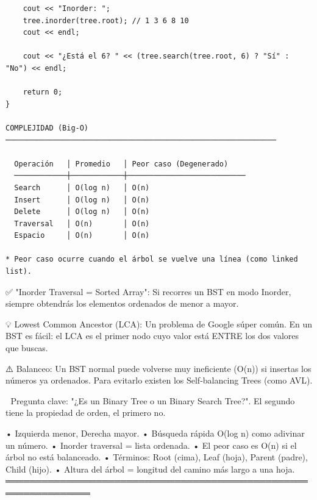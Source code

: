 \begin{lstlisting}
    cout << "Inorder: ";
    tree.inorder(tree.root); // 1 3 6 8 10 
    cout << endl;

    cout << "¿Está el 6? " << (tree.search(tree.root, 6) ? "Sí" : "No") << endl;

    return 0;
}

COMPLEJIDAD (Big-O)
──────────────────────────────────────────────────────────────

  Operación   │ Promedio   │ Peor caso (Degenerado)
  ────────────┼────────────┼───────────────────────────
  Search      │ O(log n)   │ O(n)
  Insert      │ O(log n)   │ O(n)
  Delete      │ O(log n)   │ O(n)
  Traversal   │ O(n)       │ O(n)
  Espacio     │ O(n)       │ O(n)

* Peor caso ocurre cuando el árbol se vuelve una línea (como linked list).
\end{lstlisting}

\begin{dsaentrevistas}

✅ "Inorder Traversal = Sorted Array": Si recorres un BST en modo 
   Inorder, siempre obtendrás los elementos ordenados de menor a mayor.

💡 Lowest Common Ancestor (LCA): Un problema de Google súper común. 
   En un BST es fácil: el LCA es el primer nodo cuyo valor está ENTRE
   los dos valores que buscas.

⚠️ Balanceo: Un BST normal puede volverse muy ineficiente (O(n)) si 
   insertas los números ya ordenados. Para evitarlo existen los 
   Self-balancing Trees (como AVL).

🔑 Pregunta clave: "¿Es un Binary Tree o un Binary Search Tree?". 
   El segundo tiene la propiedad de orden, el primero no.

\end{dsaentrevistas}

\begin{dsaresumen}

• Izquierda menor, Derecha mayor.
• Búsqueda rápida O(log n) como adivinar un número.
• Inorder traversal = lista ordenada.
• El peor caso es O(n) si el árbol no está balanceado.
• Términos: Root (cima), Leaf (hoja), Parent (padre), Child (hijo).
• Altura del árbol = longitud del camino más largo a una hoja.
════════════════════════════════════════════════════════════════

\end{dsaresumen}


